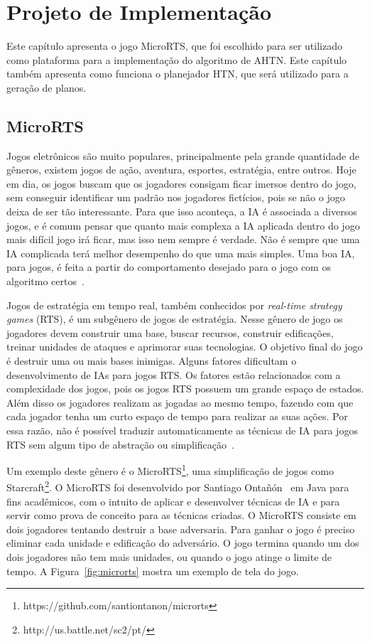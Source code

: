 
\chapter{\label{chap:proj}Projeto de Implementação}

Este capítulo apresenta o jogo MicroRTS, que foi escolhido para ser utilizado como plataforma para a implementação do algoritmo de AHTN. Este capítulo também apresenta como funciona o planejador HTN, que será utilizado para a geração de planos.

\section{MicroRTS}  \label{sec:microrts}

Jogos eletrônicos são muito populares, principalmente pela grande quantidade de gêneros, existem jogos de ação, aventura, esportes, estratégia, entre outros. Hoje em dia, os jogos buscam que os jogadores consigam ficar imersos dentro do jogo, sem conseguir identificar um padrão nos jogadores fictícios, pois se não o jogo deixa de ser tão interessante.
Para que isso aconteça, a IA é associada a diversos jogos, e é comum pensar que quanto mais complexa a IA aplicada dentro do jogo mais difícil jogo irá ficar, mas isso nem sempre é verdade.
Não é sempre que uma IA complicada terá melhor desempenho do que uma mais simples.
Uma boa IA, para jogos, é feita a partir do comportamento desejado para o jogo com os algoritmo certos~\cite{millington2009artificial}.

Jogos de estratégia em tempo real, também conhecidos por \textit{real-time strategy games} (RTS), é um subgênero de jogos de estratégia. 
Nesse gênero de jogo os jogadores devem construir uma base, buscar recursos, construir edificações, treinar unidades de ataques e aprimorar suas tecnologias.
O objetivo final do jogo é destruir uma ou mais bases inimigas. 
Alguns fatores dificultam o desenvolvimento de IAs para jogos RTS. 
Os fatores estão relacionados com a complexidade dos jogos, pois os jogos RTS possuem um grande espaço de estados.
Além disso os jogadores realizam as jogadas ao mesmo tempo, fazendo com que cada jogador tenha um curto espaço de tempo para realizar as suas ações.
Por essa razão, não é possível traduzir automaticamente as técnicas de IA para jogos RTS sem algum tipo de abstração ou simplificação~\cite{ontanon2013survey, buro2012real}.

Um exemplo deste gênero é o MicroRTS\footnote{https://github.com/santiontanon/microrts}, uma simplificação de jogos como Starcraft\footnote{http://us.battle.net/sc2/pt/}. 
O MicroRTS foi desenvolvido por Santiago Ontañón~\cite{ontanon2013combinatorial} em Java para fins acadêmicos, com o intuito de aplicar e desenvolver técnicas de IA e para servir como prova de conceito para as técnicas criadas.
O MicroRTS consiste em dois jogadores tentando destruir a base adversaria. 
Para ganhar o jogo é preciso eliminar cada unidade e edificação do adversário. 
O jogo termina quando um dos dois jogadores não tem mais unidades, ou quando o jogo atinge o limite de tempo. 
A Figura~\ref{fig:microrts} mostra um exemplo de tela do jogo.

